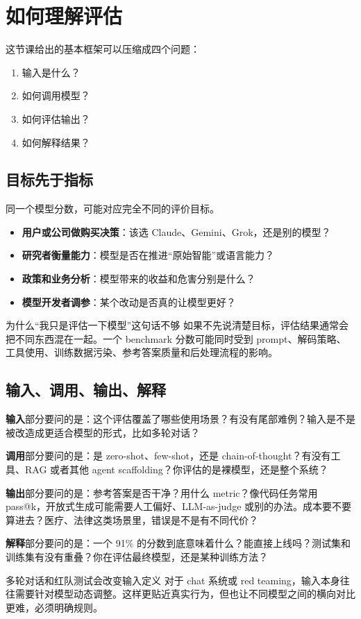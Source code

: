 \section{如何理解评估}

这节课给出的基本框架可以压缩成四个问题：

\begin{enumerate}
    \item 输入是什么？
    \item 如何调用模型？
    \item 如何评估输出？
    \item 如何解释结果？
\end{enumerate}

\subsection{目标先于指标}

同一个模型分数，可能对应完全不同的评价目标。

\begin{itemize}
    \item \textbf{用户或公司做购买决策}：该选 Claude、Gemini、Grok，还是别的模型？
    \item \textbf{研究者衡量能力}：模型是否在推进``原始智能''或语言能力？
    \item \textbf{政策和业务分析}：模型带来的收益和危害分别是什么？
    \item \textbf{模型开发者调参}：某个改动是否真的让模型更好？
\end{itemize}

\begin{warningbox}{为什么``我只是评估一下模型''这句话不够}
如果不先说清楚目标，评估结果通常会把不同东西混在一起。一个 benchmark 分数可能同时受到 prompt、解码策略、工具使用、训练数据污染、参考答案质量和后处理流程的影响。
\end{warningbox}

\subsection{输入、调用、输出、解释}

\textbf{输入}部分要问的是：这个评估覆盖了哪些使用场景？有没有尾部难例？输入是不是被改造成更适合模型的形式，比如多轮对话？

\textbf{调用}部分要问的是：是 zero-shot、few-shot，还是 chain-of-thought？有没有工具、RAG 或者其他 agent scaffolding？你评估的是裸模型，还是整个系统？

\textbf{输出}部分要问的是：参考答案是否干净？用什么 metric？像代码任务常用 pass@k，开放式生成可能需要人工偏好、LLM-as-judge 或别的办法。成本要不要算进去？医疗、法律这类场景里，错误是不是有不同代价？

\textbf{解释}部分要问的是：一个 91\% 的分数到底意味着什么？能直接上线吗？测试集和训练集有没有重叠？你在评估最终模型，还是某种训练方法？

\begin{importantbox}{多轮对话和红队测试会改变输入定义}
对于 chat 系统或 red teaming，输入本身往往需要针对模型动态调整。这样更贴近真实行为，但也让不同模型之间的横向对比更难，必须明确规则。
\end{importantbox}

